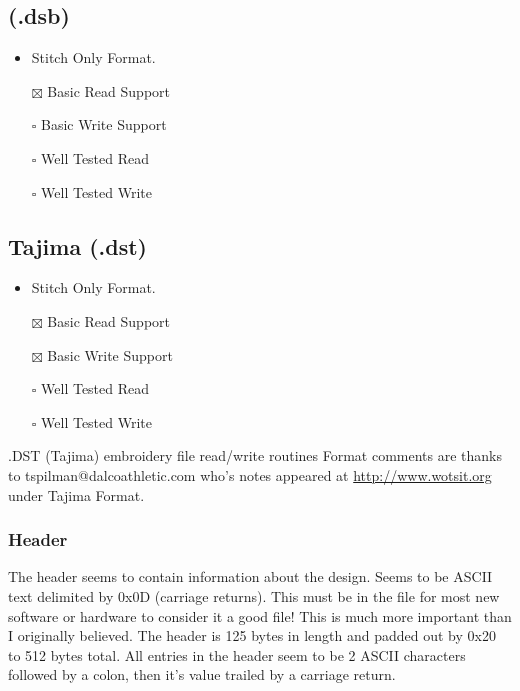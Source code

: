 \documentclass[onesize, a4paper]{refart}
\providecommand{\tightlist}{\setlength{\itemsep}{0pt}\setlength{\parskip}{0pt}}
\begin{document}
\hypertarget{dsb}{%
\subsection{(.dsb)}\label{dsb}}

\begin{itemize}
\tightlist
\item
  Stitch Only Format.
\item[$\boxtimes$]
  Basic Read Support
\item[$\square$]
  Basic Write Support
\item[$\square$]
  Well Tested Read
\item[$\square$]
  Well Tested Write
\end{itemize}

\subsection{Tajima (.dst)}

\begin{itemize}
\tightlist
\item Stitch Only Format.
\item[$\boxtimes$] Basic Read Support
\item[$\boxtimes$] Basic Write Support
\item[$\square$] Well Tested Read
\item[$\square$] Well Tested Write
\end{itemize}

.DST (Tajima) embroidery file read/write routines
Format comments are thanks to tspilman@dalcoathletic.com who's
notes appeared at \url{http://www.wotsit.org} under Tajima Format.

\subsubsection{Header}

The header seems to contain information about the design.
Seems to be ASCII text delimited by 0x0D (carriage returns).
This must be in the file for most new software or hardware
to consider it a good file! This is much more important
than I originally believed. The header is 125 bytes in
length and padded out by 0x20 to 512 bytes total.
All entries in the header seem to be 2 ASCII characters
followed by a colon, then it's value trailed by a carriage return.
\end{document}

